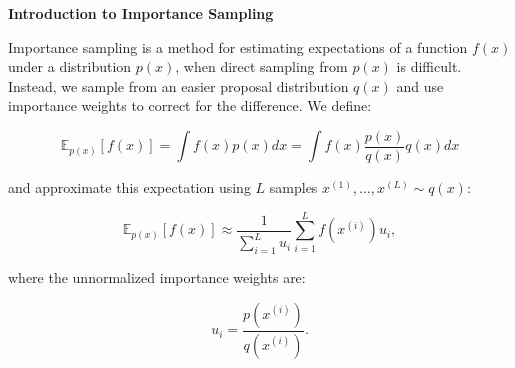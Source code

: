 \documentclass[12pt,letterpaper, onecolumn]{exam}
\begin{document}
\begin{questions}
\begin{solution}
\begin{parts}
        \part  
        \part  
    \end{parts}
\end{solution}


\question[20 points] \textbf{Introduction to Importance Sampling} \droppoints  

Importance sampling is a method for estimating expectations of a function \( f(x) \) under a distribution \( p(x) \), when direct sampling from \( p(x) \) is difficult. Instead, we sample from an easier proposal distribution \( q(x) \) and use importance weights to correct for the difference. We define:

\[
\mathbb{E}_{p(x)}[f(x)] = \int f(x) p(x) dx = \int f(x) \frac{p(x)}{q(x)} q(x) dx
\]

and approximate this expectation using \( L \) samples \( x^{(1)}, \dots, x^{(L)} \sim q(x) \):

\[
\mathbb{E}_{p(x)}[f(x)] \approx \frac{1}{\sum_{i=1}^L u_i} \sum_{i=1}^L f(x^{(i)}) u_i,
\]

where the unnormalized importance weights are:

\[
u_i = \frac{p(x^{(i)})}{q(x^{(i)})}.
\]

\end{questions}
\end{document}
